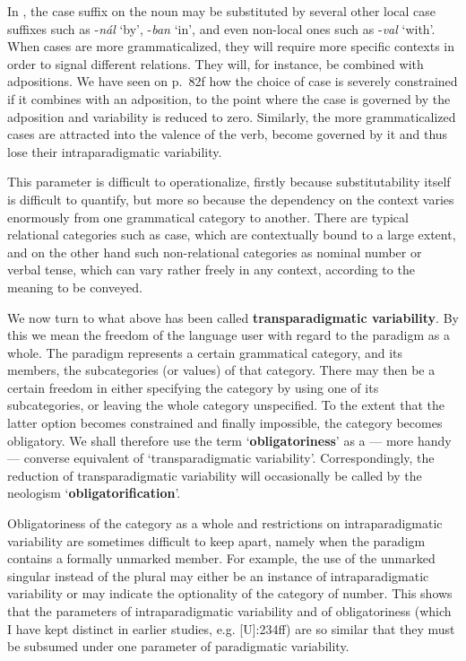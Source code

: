 In , the case suffix on the noun may be substituted by several other local case suffixes such as -\textit{nál} ‘by’, -\textit{ban} ‘in’, and even non-local ones such as -\textit{val} ‘with’. When cases are more grammaticalized, they will require more specific contexts in order to signal different relations. They will, for instance, be combined with adpositions. We have seen on p.~82f how the choice of case is severely constrained if it combines with an adposition, to the point where the case is governed by the adposition and variability is reduced to zero. Similarly, the more grammaticalized cases are attracted into the valence of the verb, become governed by it and thus lose their intraparadigmatic variability.

This parameter is difficult to operationalize, firstly because substitutability itself is difficult to quantify, but more so because the dependency on the context varies enormously from one grammatical category to another. There are typical relational categories such as case, which are contextually bound to a large extent, and on the other hand such non-relational categories as nominal number or verbal tense, which can vary rather freely in any context, according to the meaning to be conveyed.

We now turn to what above has been called \textbf{transparadigmatic variability}. By this we mean the freedom of the language user with regard to the paradigm as a whole. The paradigm represents a certain grammatical category, and its members, the subcategories (or values) of that category. There may then be a certain freedom in either specifying the category by using one of its subcategories, or leaving the whole category unspecified. To the extent that the latter option becomes constrained and finally impossible, the category becomes obligatory. We shall therefore use the term ‘\textbf{obligatoriness}’ as a — more handy — converse equivalent of ‘transparadigmatic variability’. Correspondingly, the reduction of transparadigmatic variability will occasionally be called by the neologism ‘\textbf{obligatorification}’.

Obligatoriness of the category as a whole and restrictions on intraparadigmatic variability are sometimes difficult to keep apart, namely when the paradigm contains a formally unmarked member. For example, the use of the unmarked singular instead of the plural may either be an instance of intraparadigmatic variability or may indicate the optionality of the category of number. This shows that the parameters of intraparadigmatic variability and of obligatoriness (which I have kept distinct in earlier studies, e.g. \citet{Lehmann1982}[U]:234ff) are so similar that they must be subsumed under one parameter of paradigmatic variability.

